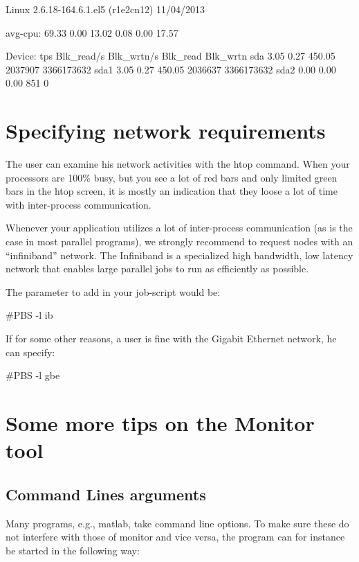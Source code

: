 \begin{prompt}
Linux 2.6.18-164.6.1.el5 (r1e2cn12)  11/04/2013

avg-cpu:  %
          69.33    0.00   13.02    0.08    0.00   17.57

Device:    tps   Blk_read/s   Blk_wrtn/s   Blk_read   Blk_wrtn
sda       3.05         0.27       450.05    2037907 3366173632
sda1      3.05         0.27       450.05    2036637 3366173632
sda2      0.00         0.00         0.00        851          0
\end{prompt}

\section{Specifying network requirements}

The user can examine his network activities with the htop command. When your
processors are 100\% busy, but you see a lot of red bars and only limited green
bars in the htop screen, it is mostly an indication that they loose a lot of
time with inter-process communication.

Whenever your application utilizes a lot of inter-process communication (as is
the case in most parallel programs), we strongly recommend to request nodes
with an ``infiniband'' network. The Infiniband is a specialized high bandwidth,
low latency network that enables large parallel jobs to run as efficiently as
possible.

The parameter to add in your job-script would be:
\begin{prompt}
#PBS -l ib
\end{prompt}

If for some other reasons, a user is fine with the Gigabit Ethernet network, he
can specify:

\begin{prompt}
#PBS -l gbe
\end{prompt}

\section{Some more tips on the Monitor tool}

\subsection{Command Lines arguments}

Many programs, e.g., matlab, take command line options. To make sure these do
not interfere with those of monitor and vice versa, the program can for
instance be started in the following way:

